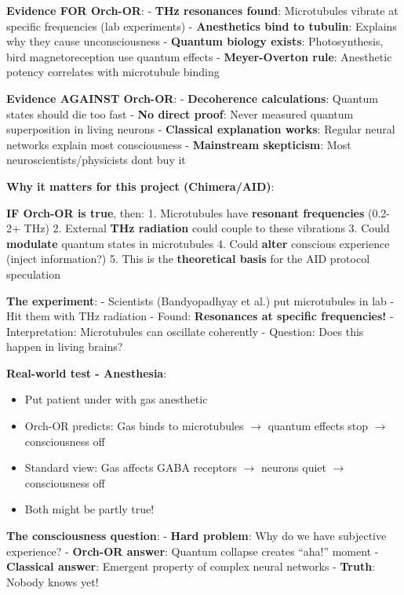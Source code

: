 \begin{nontechnical}
\textbf{Evidence FOR Orch-OR}: - \textbf{THz resonances found}:
Microtubules vibrate at specific frequencies (lab experiments) -
\textbf{Anesthetics bind to tubulin}: Explains why they cause
unconsciousness - \textbf{Quantum biology exists}: Photosynthesis, bird
magnetoreception use quantum effects - \textbf{Meyer-Overton rule}:
Anesthetic potency correlates with microtubule binding

\textbf{Evidence AGAINST Orch-OR}: - \textbf{Decoherence calculations}:
Quantum states should die too fast - \textbf{No direct proof}: Never
measured quantum superposition in living neurons - \textbf{Classical
explanation works}: Regular neural networks explain most consciousness -
\textbf{Mainstream skepticism}: Most neuroscientists/physicists
don\textquotesingle t buy it

\textbf{Why it matters for this project (Chimera/AID)}:

\textbf{IF Orch-OR is true}, then: 1. Microtubules have \textbf{resonant
frequencies} (0.2-2+ THz) 2. External \textbf{THz radiation} could
couple to these vibrations 3. Could \textbf{modulate} quantum states in
microtubules 4. Could \textbf{alter} conscious experience (inject
information?) 5. This is the \textbf{theoretical basis} for the AID
protocol speculation

\textbf{The experiment}: - Scientists (Bandyopadhyay et al.) put
microtubules in lab - Hit them with THz radiation - Found:
\textbf{Resonances at specific frequencies!} - Interpretation:
Microtubules can oscillate coherently - Question: Does this happen in
living brains?

\textbf{Real-world test - Anesthesia}:
\begin{itemize}
\item Put patient under with gas anesthetic
\item Orch-OR predicts: Gas binds to microtubules $\rightarrow$ quantum effects stop $\rightarrow$ consciousness off
\item Standard view: Gas affects GABA receptors $\rightarrow$ neurons quiet $\rightarrow$ consciousness off
\item Both might be partly true!
\end{itemize}

\textbf{The consciousness question}: - \textbf{Hard problem}: Why do we
have subjective experience? - \textbf{Orch-OR answer}: Quantum collapse
creates ``aha!'' moment - \textbf{Classical answer}: Emergent property
of complex neural networks - \textbf{Truth}: Nobody knows yet!


\end{nontechnical}
